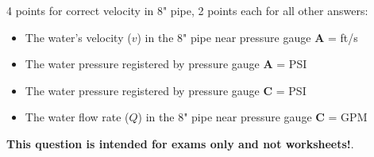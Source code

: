 
4 points for correct velocity in 8" pipe, 2 points each for all other answers:

\begin{itemize}
\item{} The water's velocity ($v$) in the 8" pipe near pressure gauge {\bf A} =  ft/s
\vskip 5pt
\item{} The water pressure registered by pressure gauge {\bf A} =  PSI
\vskip 5pt
\item{} The water pressure registered by pressure gauge {\bf C} =  PSI
\vskip 5pt
\item{} The water flow rate ($Q$) in the 8" pipe near pressure gauge {\bf C} =  GPM
\end{itemize}







{\bf This question is intended for exams only and not worksheets!}.



